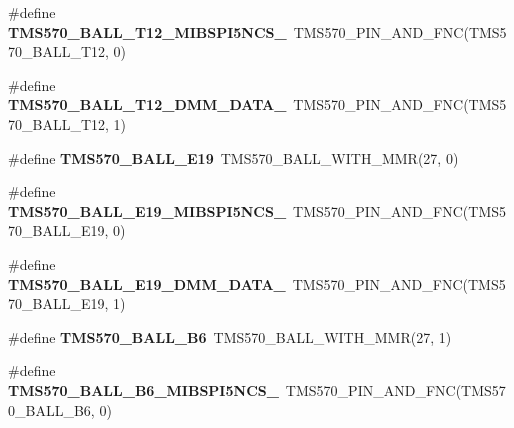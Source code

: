 \begin{DoxyCompactItemize}
\mbox{\label{tms570ls3137zwt-pins_8h_aa1c49ad364c59bff22ff3df3720fbb4a}} 
\#define {\bfseries T\+M\+S570\+\_\+\+B\+A\+L\+L\+\_\+\+T12\+\_\+\+M\+I\+B\+S\+P\+I5\+N\+C\+S\+\_}~T\+M\+S570\+\_\+\+P\+I\+N\+\_\+\+A\+N\+D\+\_\+\+F\+NC(T\+M\+S570\+\_\+\+B\+A\+L\+L\+\_\+\+T12, 0)
\item 
\mbox{\label{tms570ls3137zwt-pins_8h_aba82ef7d9ad53f5382ad9935ca2a4cef}} 
\#define {\bfseries T\+M\+S570\+\_\+\+B\+A\+L\+L\+\_\+\+T12\+\_\+\+D\+M\+M\+\_\+\+D\+A\+T\+A\+\_}~T\+M\+S570\+\_\+\+P\+I\+N\+\_\+\+A\+N\+D\+\_\+\+F\+NC(T\+M\+S570\+\_\+\+B\+A\+L\+L\+\_\+\+T12, 1)
\item 
\mbox{\label{tms570ls3137zwt-pins_8h_a3c5317e9c1f0b7d90e3edaadf9f670f1}} 
\#define {\bfseries T\+M\+S570\+\_\+\+B\+A\+L\+L\+\_\+\+E19}~T\+M\+S570\+\_\+\+B\+A\+L\+L\+\_\+\+W\+I\+T\+H\+\_\+\+M\+MR(27, 0)
\item 
\mbox{\label{tms570ls3137zwt-pins_8h_aae1559fb893b6358edaabcd9a0370af9}} 
\#define {\bfseries T\+M\+S570\+\_\+\+B\+A\+L\+L\+\_\+\+E19\+\_\+\+M\+I\+B\+S\+P\+I5\+N\+C\+S\+\_}~T\+M\+S570\+\_\+\+P\+I\+N\+\_\+\+A\+N\+D\+\_\+\+F\+NC(T\+M\+S570\+\_\+\+B\+A\+L\+L\+\_\+\+E19, 0)
\item 
\mbox{\label{tms570ls3137zwt-pins_8h_ab9928e1cc28e1417e10ae5f9c141e266}} 
\#define {\bfseries T\+M\+S570\+\_\+\+B\+A\+L\+L\+\_\+\+E19\+\_\+\+D\+M\+M\+\_\+\+D\+A\+T\+A\+\_}~T\+M\+S570\+\_\+\+P\+I\+N\+\_\+\+A\+N\+D\+\_\+\+F\+NC(T\+M\+S570\+\_\+\+B\+A\+L\+L\+\_\+\+E19, 1)
\item 
\mbox{\label{tms570ls3137zwt-pins_8h_af8d7d3275def41f47a005dca421ddb7b}} 
\#define {\bfseries T\+M\+S570\+\_\+\+B\+A\+L\+L\+\_\+\+B6}~T\+M\+S570\+\_\+\+B\+A\+L\+L\+\_\+\+W\+I\+T\+H\+\_\+\+M\+MR(27, 1)
\item 
\mbox{\label{tms570ls3137zwt-pins_8h_a59fde4841e8967923615fad578eb4da7}} 
\#define {\bfseries T\+M\+S570\+\_\+\+B\+A\+L\+L\+\_\+\+B6\+\_\+\+M\+I\+B\+S\+P\+I5\+N\+C\+S\+\_}~T\+M\+S570\+\_\+\+P\+I\+N\+\_\+\+A\+N\+D\+\_\+\+F\+NC(T\+M\+S570\+\_\+\+B\+A\+L\+L\+\_\+\+B6, 0)
\item 
\mbox{\label{tms570ls3137zwt-pins_8h_a5190f64ff966395de8e95c990537a7f0}} 

\end{DoxyCompactItemize}

